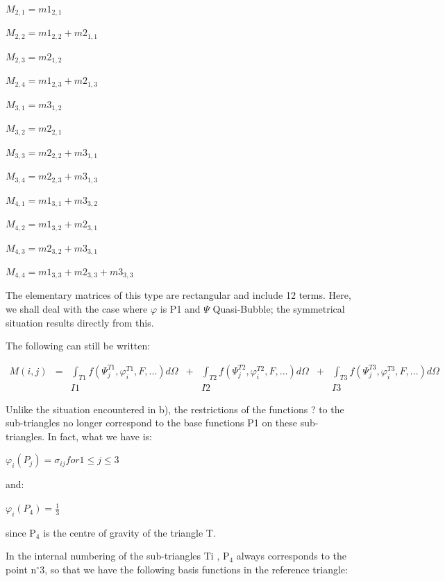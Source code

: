 $M_{2,1} = m1_{2,1}$

$M_{2,2} = m1_{2,2} + m2_{1,1}$

$M_{2,3} = m2_{1,2}$

$M_{2,4} = m1_{2,3} + m2_{1,3}$

$M_{3,1} = m3_{1,2}$

$M_{3,2} = m2_{2,1}$

$M_{3,3} = m2_{2,2} + m3_{1,1}$

$M_{3,4} = m2_{2,3} + m3_{1,3}$

$M_{4,1} = m1_{3,1} + m3_{3,2}$

$M_{4,2} = m1_{3,2} + m2_{3,1}$

$M_{4,3} = m2_{3,2} + m3_{3,1}$

$M_{4,4} = m1_{3,3} + m2_{3,3} + m3_{3,3}$


The elementary matrices of this type are rectangular and include 12 terms.
Here, we shall deal with the case where $\varphi$ is P1 and $\Psi$
Quasi-Bubble; the symmetrical situation results directly from this.

The following can still be written:

\[
\begin{array}{ccccccc}
M(i,j) & = &\int _{T1}f(\Psi _{j}^{T1} ,\varphi _{i}^{T1} ,F,...)d\Omega & + & \int _{T2}f(\Psi _{j}^{T2} ,\varphi _{i}^{T2} ,F,...)d\Omega & + & \int _{T3}f(\Psi _{j}^{T3} ,\varphi _{i}^{T3} ,F,...)d\Omega  \\
       &   &   I1                                                         &   &    I2                                                        &   &   I3
\end{array}
\]

Unlike the situation encountered in b), the restrictions of the functions ? to
the sub-triangles no longer correspond to the base functions P1 on these
sub-triangles. In fact, what we have is:

$\varphi_{i}(P_{j})=\sigma _{ij} for 1 \le j \le 3$

and:

$\varphi_{i}(P_{4})=\frac{1}{3}$

since P${}_{4}$ is the centre of gravity of the triangle T.

In the internal numbering of the sub-triangles Ti , P${}_{4}$ always
corresponds to the point n${}^\circ$3, so that we have the following basis
functions in the reference triangle:


